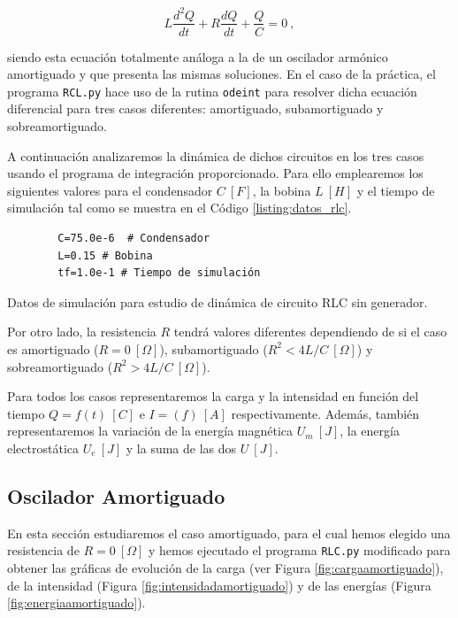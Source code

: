 \documentclass[journal]{IEEEtran}
\newenvironment{code}{\captionsetup{type=listing}}{\par\addvspace{\baselineskip}}
\begin{document}
\begin{equation}
L\frac{d^2Q}{dt} + R\frac{dQ}{dt} + \frac{Q}{C} = 0 ~,
\end{equation}

siendo esta ecuación totalmente análoga a la de un oscilador armónico amortiguado y que presenta las mismas soluciones. En el caso de la práctica, el programa \texttt{RCL.py} hace uso de la rutina \texttt{odeint} para resolver dicha ecuación diferencial para tres casos diferentes: amortiguado, subamortiguado y sobreamortiguado.

A continuación analizaremos la dinámica de dichos circuitos en los tres casos usando el programa de integración proporcionado. Para ello emplearemos los siguientes valores para el condensador $C~[F]$, la bobina $L~[H]$ y el tiempo de simulación tal como se muestra en el Código \ref{listing:datos_rlc}.

\bigskip

\begin{code}
    \begin{verbatim}
        C=75.0e-6  # Condensador
        L=0.15 # Bobina
        tf=1.0e-1 # Tiempo de simulación
    \end{verbatim}
    \caption{Datos de simulación para estudio de dinámica de circuito RLC sin generador.}
    \label{listing:datos_rlc}
\end{code}

Por otro lado, la resistencia $R$ tendrá valores diferentes dependiendo de si el caso es amortiguado ($R=0~[\Omega]$), subamortiguado ($R^2 < 4L/C ~ [\Omega]$) y sobreamortiguado ($R^2 > 4L/C ~ [\Omega]$).

Para todos los casos representaremos la carga y la intensidad en función del tiempo $Q = f(t)~[C]$ e $I = (f)~[A]$ respectivamente. Además, también representaremos la variación de la energía magnética $U_m~[J]$, la energía electrostática $U_e~[J]$ y la suma de las dos $U~[J]$.

\subsection{Oscilador Amortiguado}
\label{subsec:osciladoramortiguado}

En esta sección estudiaremos el caso amortiguado, para el cual hemos elegido una resistencia de $R=0~[\Omega]$ y hemos ejecutado el programa \texttt{RLC.py} modificado para obtener las gráficas de evolución de la carga (ver Figura \ref{fig:cargaamortiguado}), de la intensidad (Figura \ref{fig:intensidadamortiguado}) y de las energías (Figura \ref{fig:energiaamortiguado}).
\end{document}
